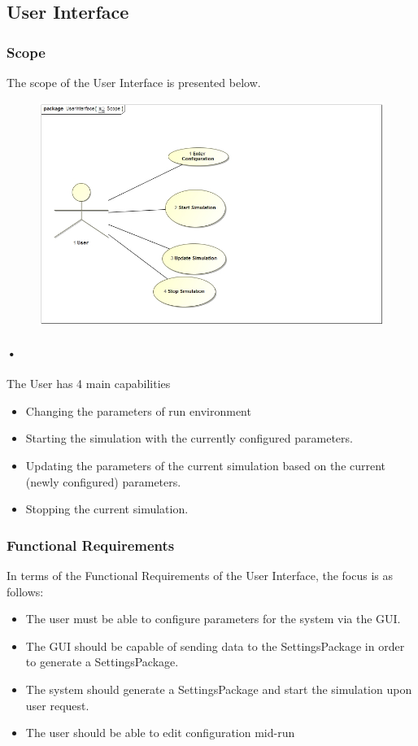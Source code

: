 \documentclass[11pt]{article}
\begin{document}
\subsection{User Interface}
\subsubsection{Scope}
The scope of the User Interface is presented below.
\begin{figure}[H]
	\includegraphics[scale=0.45]{GUI_Scope.jpg}
\end{figure}

\paragraph{•}
The User has 4 main capabilities
\begin{itemize}
	\item Changing the parameters of run environment
	\item Starting the simulation with the currently configured parameters.
	\item Updating the parameters of the current simulation based on the current (newly configured) parameters.
	\item Stopping the current simulation.
\end{itemize}

\subsubsection{Functional Requirements}
In terms of the Functional Requirements of the User Interface, the focus is as follows:
\begin{itemize}
	\item The user must be able to configure parameters for the system via the GUI.
	\item The GUI should be capable of sending data to the SettingsPackage in order to generate a SettingsPackage.
	\item The system should generate a SettingsPackage and start the simulation upon user request.
	\item The user should be able to edit configuration mid-run
\end{itemize}
\end{document}
